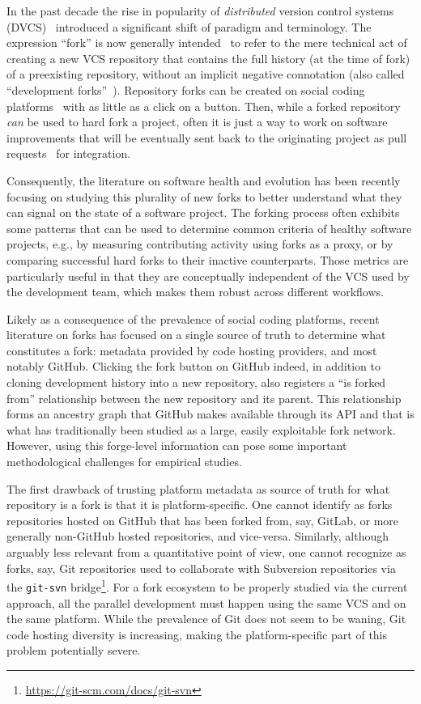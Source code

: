 In the past decade the rise in popularity of \emph{distributed} version control
systems (DVCS)~\cite{spinellis2005vcs} introduced a significant shift of
paradigm and terminology. The expression ``fork'' is now generally
intended~\cite{zhou2019fork} to refer to the mere technical act of creating a
new VCS repository that contains the full history (at the time of fork) of a
preexisting repository, without an implicit negative connotation (also called
``development forks''~\cite{fogel2005producingoss}). Repository forks can be
created on social coding platforms~\cite{dabbish2012socialcoding,
thung2013network} with as little as a click on a button. Then, while a forked
repository \emph{can} be used to hard fork a project, often it is just a way to
work on software improvements that will be eventually sent back to the
originating project as pull requests~\cite{gousios2014pullrequests} for
integration.

Consequently, the literature on software health and evolution has been
recently focusing on studying this plurality of new forks to better
understand what they can signal on the state of a software project. The
forking process often exhibits some patterns that can be used to determine
common criteria of healthy software projects, e.g., by measuring contributing
activity using forks as a proxy, or by comparing successful hard forks to
their inactive counterparts. Those metrics are particularly useful in that
they are conceptually independent of the VCS used by the development team,
which makes them robust across different workflows.

Likely as a consequence of the prevalence of social coding platforms, recent
literature on forks has focused on a single source of truth to determine what
constitutes a fork: metadata provided by code hosting providers, and most
notably GitHub. Clicking the fork button on GitHub indeed, in addition to
cloning development history into a new repository, also registers a ``is forked
from'' relationship between the new repository and its parent. This
relationship forms an ancestry graph that GitHub makes available through its
API and that is what has traditionally been studied as a large, easily
exploitable fork network. However, using this forge-level information can pose
some important methodological challenges for empirical studies.

The first drawback of trusting platform metadata as source of truth for what
repository is a fork is that it is platform-specific. One cannot identify as
forks repositories hosted on GitHub that has been forked from, say, GitLab, or
more generally non-GitHub hosted repositories, and vice-versa. Similarly,
although arguably less relevant from a quantitative point of view, one cannot
recognize as forks, say, Git repositories used to collaborate with Subversion
repositories via the \texttt{git-svn}
bridge\footnote{\url{https://git-scm.com/docs/git-svn}}. For a fork ecosystem
to be properly studied via the current approach, all the parallel development
must happen using the same VCS and on the same platform. While the prevalence
of Git does not seem to be waning, Git code hosting diversity is increasing,
making the platform-specific part of this problem potentially severe.

